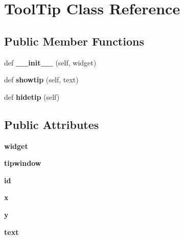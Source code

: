 \hypertarget{class_c_tool_tip_1_1_tool_tip}{}\section{Tool\+Tip Class Reference}
\label{class_c_tool_tip_1_1_tool_tip}
\subsection*{Public Member Functions}
\begin{DoxyCompactItemize}
\item 
\mbox{\label{class_c_tool_tip_1_1_tool_tip_a7a24c74c784397a6e0c975a1663caaef}} 
def {\bfseries \+\_\+\+\_\+init\+\_\+\+\_\+} (self, widget)
\item 
\mbox{\label{class_c_tool_tip_1_1_tool_tip_a99188c354b55f1e2e660050532f83926}} 
def {\bfseries showtip} (self, text)
\item 
\mbox{\label{class_c_tool_tip_1_1_tool_tip_ab5e9ac7b2957f299e378b70d47760a88}} 
def {\bfseries hidetip} (self)
\end{DoxyCompactItemize}
\subsection*{Public Attributes}
\begin{DoxyCompactItemize}
\item 
\mbox{\label{class_c_tool_tip_1_1_tool_tip_a60d5947424f4fcd4ca9ed05e6dc43227}} 
{\bfseries widget}
\item 
\mbox{\label{class_c_tool_tip_1_1_tool_tip_a5463352dcbbdaaeb782f0484b30f87f1}} 
{\bfseries tipwindow}
\item 
\mbox{\label{class_c_tool_tip_1_1_tool_tip_acf2488b95c97e0378c9bf49de3b50f28}} 
{\bfseries id}
\item 
\mbox{\label{class_c_tool_tip_1_1_tool_tip_a9336ebf25087d91c818ee6e9ec29f8c1}} 
{\bfseries x}
\item 
\mbox{\label{class_c_tool_tip_1_1_tool_tip_a2fb1c5cf58867b5bbc9a1b145a86f3a0}} 
{\bfseries y}
\item 
\mbox{\label{class_c_tool_tip_1_1_tool_tip_af575f17e6be3f269b86b041a60560dbf}} 
{\bfseries text}
\end{DoxyCompactItemize}


